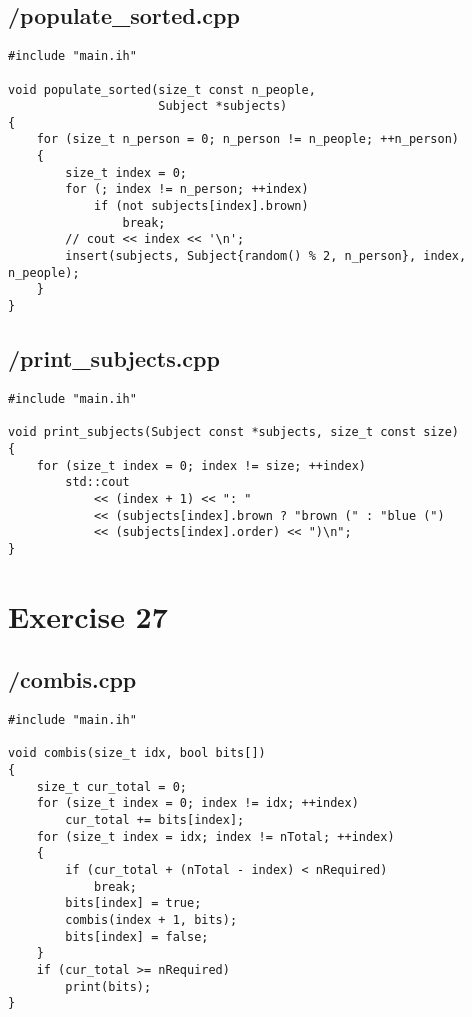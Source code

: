 \documentclass{article}
\begin{document}
\subsection*{/populate\_sorted.cpp}
\begin{verbatim}
#include "main.ih"

void populate_sorted(size_t const n_people,
                     Subject *subjects)
{
    for (size_t n_person = 0; n_person != n_people; ++n_person)
    {
        size_t index = 0;
        for (; index != n_person; ++index)
            if (not subjects[index].brown)
                break;
        // cout << index << '\n';
        insert(subjects, Subject{random() % 2, n_person}, index, n_people);
    }
}

\end{verbatim}
\subsection*{/print\_subjects.cpp}
\begin{verbatim}
#include "main.ih"

void print_subjects(Subject const *subjects, size_t const size)
{
    for (size_t index = 0; index != size; ++index)
        std::cout 
            << (index + 1) << ": "
            << (subjects[index].brown ? "brown (" : "blue (")
            << (subjects[index].order) << ")\n";
}
\end{verbatim}

\section*{Exercise 27}
\subsection*{/combis.cpp}
\begin{verbatim}
#include "main.ih"

void combis(size_t idx, bool bits[])
{
    size_t cur_total = 0;
    for (size_t index = 0; index != idx; ++index)
        cur_total += bits[index];
    for (size_t index = idx; index != nTotal; ++index)
    {
        if (cur_total + (nTotal - index) < nRequired)
            break;
        bits[index] = true;
        combis(index + 1, bits);
        bits[index] = false;
    }
    if (cur_total >= nRequired)
        print(bits);
}

\end{verbatim}
\end{document}
